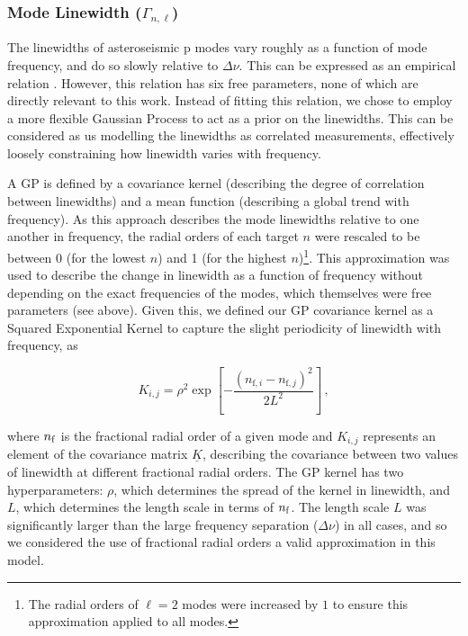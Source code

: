 \documentclass[12pt]{article}
\newcommand{\dnu}{\mbox{$\Delta \nu$}\xspace}
\begin{document}
\subsubsection{Mode Linewidth ($\Gamma_{n,\ell}$)}
The linewidths of asteroseismic p modes vary roughly as a function of mode frequency, and do so slowly relative to \dnu. This can be expressed as an empirical relation \cite{davies+2014, appourchaux+2016, lund+2017}. However, this relation has six free parameters, none of which are directly relevant to this work. Instead of fitting this relation, we chose to employ a more flexible Gaussian Process \cite[GP]{rasmussen+williams2006} to act as a prior on the linewidths. This can be considered as us modelling the linewidths as correlated measurements, effectively loosely constraining how linewidth varies with frequency.

A GP is defined by a covariance kernel (describing the degree of correlation between linewidths) and a mean function (describing a global trend with frequency). As this approach describes the mode linewidths relative to one another in frequency, the radial orders of each target $n$ were rescaled to be between 0 (for the lowest $n$) and 1 (for the highest $n$)\footnote{The radial orders of $\ell = 2$ modes were increased by $1$ to ensure this approximation applied to all modes.}. This approximation was used to describe the change in linewidth as a function of frequency without depending on the exact frequencies of the modes, which themselves were free parameters (see above). Given this, we defined our GP covariance kernel as a Squared Exponential Kernel to capture the slight periodicity of linewidth with frequency, as

\begin{equation}\label{eq:gpkernel}
	K_{i,j} = \rho^2 \exp \left[ -\frac{(n_{\textrm{f}, i} - n_{\textrm{f}, j})^2}{2L^2} \right]\, ,
\end{equation}

\noindent where $n_{\rm f}$ is the fractional radial order of a given mode and  $K_{i,j}$ represents an element of the covariance matrix $\underline{K}$, describing the covariance between two values of linewidth at different fractional radial orders. The GP kernel has two hyperparameters: $\rho$, which determines the spread of the kernel in linewidth, and $L$, which determines the length scale in terms of $n_{\rm f}$. The length scale $L$ was significantly larger than the large frequency separation (\dnu) in all cases, and so we considered the use of fractional radial orders a valid approximation in this model.
\end{document}
